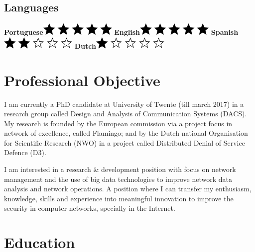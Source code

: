\documentclass[print]{friggeri-cv} %
\begin{document}
\begin{aside}
\section{Languages}
	\textbf{Portuguese}\includegraphics[scale=0.50]{img/5stars.png}
	\textbf{English}\includegraphics[scale=0.50]{img/5stars.png}
	\textbf{Spanish}\includegraphics[scale=0.50]{img/2stars.png}
	\textbf{Dutch}\includegraphics[scale=0.50]{img/1star.png}
\end{aside}

\section{Professional Objective}
I am currently a PhD candidate at University of Twente (till march 2017) in a research group called Design and Analysis of Communication Systems (DACS). My research is founded by the European commission via a project focus in network of excellence, called Flamingo; and by the Dutch national Organisation for Scientific Research (NWO) in a project called Distributed Denial of Service Defence (D3).

I am interested in a research \& development position with focus on network management and the use of big data technologies to improve network data analysis and network operations. A position where I can transfer my enthusiasm, knowledge, skills and experience into meaningful innovation to improve the security in computer networks, specially in the Internet. 

\section{Education}
\end{document}
